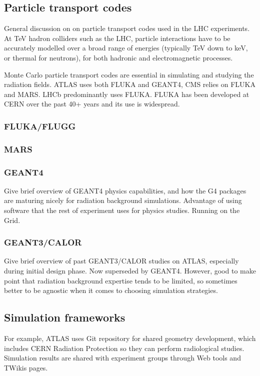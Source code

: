\subsection{Particle transport codes}
\label{sim-codes}

General discussion on on particle transport codes used in the LHC experiments. 
At TeV hadron colliders such as the LHC, particle interactions have to be accurately modelled over a broad range of energies (typically TeV down to keV, or thermal for neutrons), for both hadronic and electromagnetic processes. 

Monte Carlo particle transport codes are essential in simulating and studying the radiation fields. 
ATLAS uses both FLUKA and GEANT4, CMS relies on FLUKA and MARS. LHCb predominantly uses FLUKA.
FLUKA has been developed at CERN over the past 40+ years and its use is widespread.



\subsubsection{FLUKA/FLUGG}
\subsubsection{MARS}
\subsubsection{GEANT4}
Give brief overview of GEANT4 physics capabilities, and how the G4 packages are maturing nicely for radiation background simulations. Advantage of using software that the rest of experiment uses for physics studies. Running on the Grid.
\subsubsection{GEANT3/CALOR}
Give brief overview of past GEANT3/CALOR studies on ATLAS, especially during initial design phase. Now superseded by GEANT4. 
However, good to make point that radiation background expertise tends to be limited, so sometimes better to be agnostic when it comes to choosing simulation strategies.


\subsection{Simulation frameworks}
\label{sim-frameworks}
For example, ATLAS uses Git repository for shared geometry development, which includes CERN Radiation Protection so they can perform radiological studies. 
Simulation results are shared with experiment groups through Web tools and TWikis pages.


